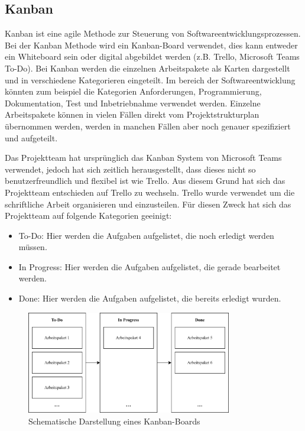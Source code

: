 \subsection{Kanban}

Kanban ist eine agile Methode zur Steuerung von Softwareentwicklungsprozessen. Bei der Kanban Methode wird ein Kanban-Board verwendet, dies kann entweder ein Whiteboard sein oder digital abgebildet werden (z.B. Trello, Microsoft Teams To-Do). Bei Kanban werden die einzelnen Arbeitspakete als Karten dargestellt und in verschiedene Kategorieren eingeteilt. Im bereich der Softwareentwicklung könnten zum beispiel die Kategorien Anforderungen, Programmierung, Dokumentation, Test und Inbetriebnahme verwendet werden. Einzelne Arbeitspakete können in vielen Fällen direkt vom Projektstrukturplan übernommen werden, werden in manchen Fällen aber noch genauer spezifiziert und aufgeteilt. \cite{kanban_vorgehensmodell}

Das Projektteam hat ursprünglich das Kanban System von Microsoft Teams verwendet, jedoch hat sich zeitlich herausgestellt, dass dieses nicht so benutzerfreundlich und flexibel ist wie Trello. Aus diesem Grund hat sich das Projektteam entschieden auf Trello zu wechseln. Trello wurde verwendet um die schriftliche Arbeit organisieren und einzusteilen. Für diesen Zweck hat sich das Projektteam auf folgende Kategorien geeinigt:
\begin{itemize}
  \item To-Do: Hier werden die Aufgaben aufgelistet, die noch erledigt werden müssen.
  \item In Progress: Hier werden die Aufgaben aufgelistet, die gerade bearbeitet werden.
  \item Done: Hier werden die Aufgaben aufgelistet, die bereits erledigt wurden.
\end{itemize}

\begin{figure}[ht]
  \centering
  \includegraphics[width=0.8\textwidth]{images/kanban.png}
  \caption{Schematische Darstellung eines Kanban-Boards}
  \label{fig:kanban}
\end{figure}

